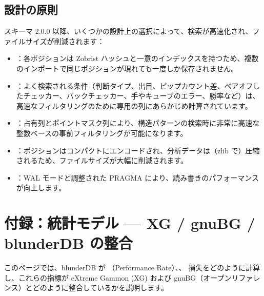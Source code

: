 \documentclass[letterpaper,10pt,dvipdfmx]{sphinxmanual}
\begin{document}
\subsection{設計の原則}
\label{\detokenize{annexe_db_scheme:principes-de-conception}}
\sphinxAtStartPar
スキーマ 2.0.0 以降、いくつかの設計上の選択によって、検索が高速化され、ファイルサイズが削減されます：
\begin{itemize}
\item {} 
\sphinxAtStartPar
{} ：各ポジションは Zobrist ハッシュと一意のインデックスを持つため、複数のインポートで同じポジションが現れても一度しか保存されません。

\item {} 
\sphinxAtStartPar
{} ：よく検索される条件（判断タイプ、出目、ピップカウント差、ベアオフしたチェッカー、バックチェッカー、手やキューブのエラー、勝率など）は、高速なフィルタリングのために専用の列にあらかじめ計算されています。

\item {} 
\sphinxAtStartPar
{} ：占有列とポイントマスク列により、構造パターンの検索時に非常に高速な整数ベースの事前フィルタリングが可能になります。

\item {} 
\sphinxAtStartPar
{} ：ポジションはコンパクトにエンコードされ、分析データは（zlib で）圧縮されるため、ファイルサイズが大幅に削減されます。

\item {} 
\sphinxAtStartPar
{} ：WAL モードと調整された PRAGMA により、読み書きのパフォーマンスが向上します。

\end{itemize}

\sphinxstepscope


\section{付録：統計モデル — XG / gnuBG / blunderDB の整合}
\label{\detokenize{stats_parity:annexe-modele-de-statistiques-alignement-xg-gnubg-blunderdb}}\label{\detokenize{stats_parity:stats-parity}}\label{\detokenize{stats_parity::doc}}
\sphinxAtStartPar
このページでは、blunderDB が （Performance Rate）、、 損失をどのように計算し、これらの指標が eXtreme Gammon (XG) および gnuBG（オープンリファレンス）とどのように整合しているかを説明します。
\end{document}
